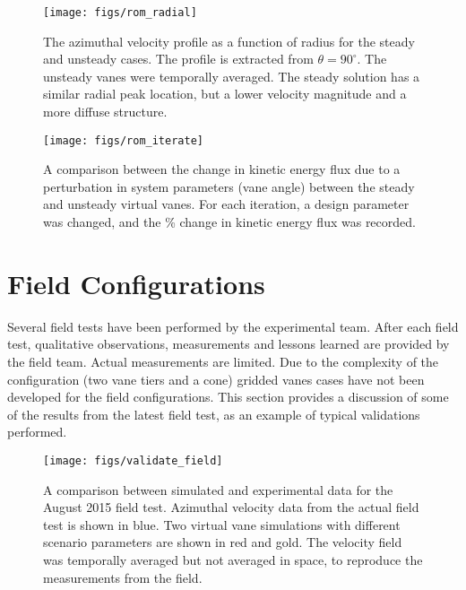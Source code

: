 
\begin{figure}[htp!]
 \centering
 \texttt{[image: figs/rom\_radial]}
 \caption{The azimuthal velocity profile as a function of radius for the
 steady and unsteady cases. The profile is extracted from $\theta =
 90^{\circ}$. The unsteady vanes were temporally averaged. The steady
 solution has a similar radial peak location, but a lower velocity
 magnitude and a more diffuse structure.}   
 \label{fig:rom_az}
\end{figure}



\begin{figure}[htp!]
 \centering
 \texttt{[image: figs/rom\_iterate]}
 \caption{A comparison between the change in kinetic energy flux due to
 a perturbation in system parameters (vane angle) between the steady and
 unsteady virtual vanes. For each iteration, a design parameter was
 changed, and the \% change in kinetic energy flux was recorded.}    
 \label{fig:rom_it}  
\end{figure}

\section{Field Configurations}
\label{sec:field_val}

Several field tests have been performed by the experimental team. After
each field test, qualitative observations, measurements and lessons
learned are provided by the field team. Actual measurements
are limited. Due to the complexity of the configuration
(two vane tiers and a cone) gridded vanes cases have not been developed 
for the field configurations. This section provides a discussion of some of
the results from the latest field test, as an example of typical
validations performed. 

 \begin{figure}[!htb]
  \begin{center}
   \texttt{[image: figs/validate\_field]}
   \caption{A comparison between simulated and experimental data for the
   August 2015 field test. Azimuthal velocity data from the actual field
   test is shown in blue. Two virtual vane simulations with different
   scenario parameters are shown in red and gold. The velocity field was
   temporally averaged but not averaged in space, to reproduce
   the measurements from the field.}
   \label{fig:field_val}
  \end{center}
 \end{figure}
%
%

